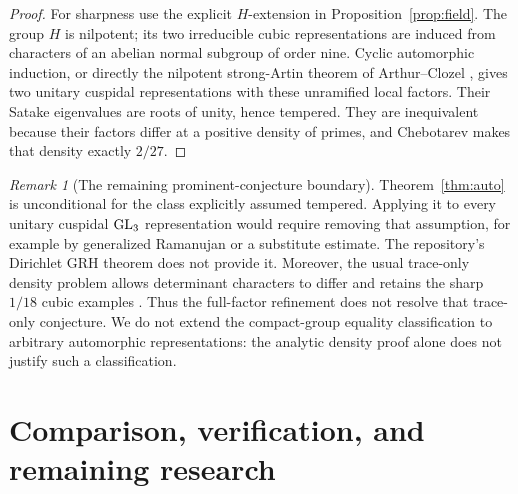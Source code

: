 \documentclass[11pt]{article}
\theoremstyle{definition}\newtheorem{definition}[theorem]{Definition}
\theoremstyle{remark}\newtheorem{remark}[theorem]{Remark}
\begin{document}
\begin{proof}
For sharpness use the explicit $H$-extension in Proposition~\ref{prop:field}. The group $H$ is nilpotent; its two irreducible cubic representations are induced from characters of an abelian normal subgroup of order nine. Cyclic automorphic induction, or directly the nilpotent strong-Artin theorem of Arthur--Clozel \cite[Chapter 3, Sections 6--7]{ArthurClozel}, gives two unitary cuspidal representations with these unramified local factors. Their Satake eigenvalues are roots of unity, hence tempered. They are inequivalent because their factors differ at a positive density of primes, and Chebotarev makes that density exactly $2/27$.
\end{proof}

\begin{remark}[The remaining prominent-conjecture boundary]
Theorem~\ref{thm:auto} is unconditional for the class explicitly assumed tempered. Applying it to every unitary cuspidal $\mathrm{GL}_3$ representation would require removing that assumption, for example by generalized Ramanujan or a substitute estimate. The repository's Dirichlet GRH theorem does not provide it. Moreover, the usual trace-only density problem allows determinant characters to differ and retains the sharp $1/18$ cubic examples \cite{MartinWalji,Walji}. Thus the full-factor refinement does not resolve that trace-only conjecture. We do not extend the compact-group equality classification to arbitrary automorphic representations: the analytic density proof alone does not justify such a classification.
\end{remark}

\section{Comparison, verification, and remaining research}
\end{document}
